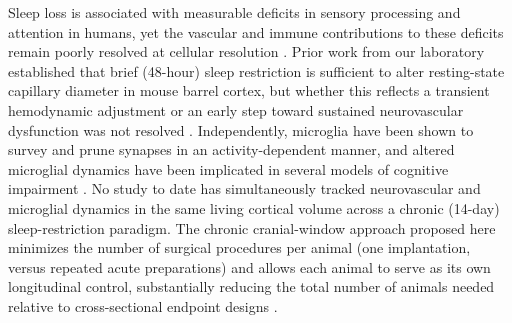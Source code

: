 \vspace{6pt}


Sleep loss is associated with measurable deficits in sensory processing and attention in
humans, yet the vascular and immune contributions to these deficits remain poorly resolved at
cellular resolution \cite{walker2017sleep}. Prior work from our laboratory established that
brief (48-hour) sleep restriction is sufficient to alter resting-state capillary diameter in
mouse barrel cortex, but whether this reflects a transient hemodynamic adjustment or an early
step toward sustained neurovascular dysfunction was not resolved \cite{lindqvist2024cortical}.
Independently, microglia have been shown to survey and prune synapses in an activity-dependent
manner, and altered microglial dynamics have been implicated in several models of cognitive
impairment \cite{osei2023microglial}. No study to date has simultaneously tracked
neurovascular and microglial dynamics in the same living cortical volume across a chronic
(14-day) sleep-restriction paradigm. The chronic cranial-window approach proposed here
minimizes the number of surgical procedures per animal (one implantation, versus repeated
acute preparations) and allows each animal to serve as its own longitudinal control,
substantially reducing the total number of animals needed relative to cross-sectional
endpoint designs \cite{nrc2011guide}.

